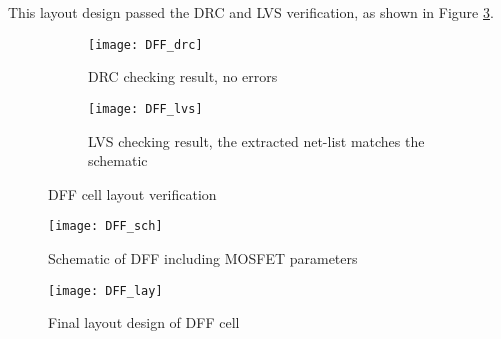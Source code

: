 This layout design passed the DRC and LVS verification, as shown in Figure \ref{fig:dff_vfy}.

\begin{figure}[!htb]
	\centering
	\begin{subfigure}[b]{0.5\textwidth}
		\texttt{[image: DFF\_drc]}
		\caption{DRC checking result, no errors}
		\label{fig:dff_drc}
	\end{subfigure}
	\begin{subfigure}[b]{0.4\textwidth}
		\texttt{[image: DFF\_lvs]}
		\caption{LVS checking result, the extracted net-list matches the schematic}
		\label{fig:dff_lvs}
	\end{subfigure}
	\caption{DFF cell layout verification}
	\label{fig:dff_vfy}
\end{figure}

\begin{sidewaysfigure}[!htb]
	\centering
	\texttt{[image: DFF\_sch]}
	\caption{Schematic of DFF including MOSFET parameters}
	\label{fig:dff_sch}
\end{sidewaysfigure}

\begin{sidewaysfigure}[!htb]
	\centering
	\texttt{[image: DFF\_lay]}
	\caption{Final layout design of DFF cell}
	\label{fig:dff_lay}
\end{sidewaysfigure}
